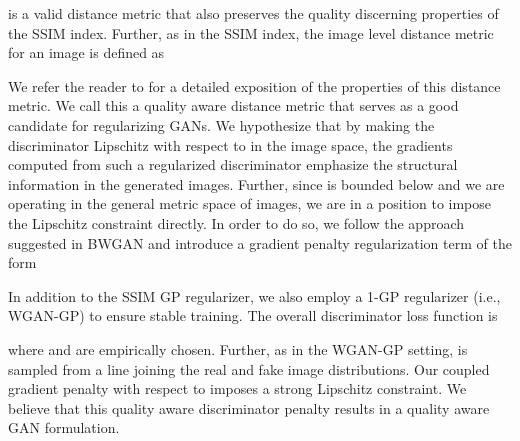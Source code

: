 \documentclass{article}
\begin{document}
is a valid distance metric that also preserves the quality discerning properties of the SSIM index. Further, as in the SSIM index, the image level distance metric for an  image is defined as

We refer the reader to \cite{brunet2011mathematical} for a detailed exposition of the properties of this distance metric. We call this a quality aware distance metric that serves as a good candidate for regularizing GANs.
We hypothesize that by making the discriminator Lipschitz with respect to  in the image space, the gradients computed from such a regularized discriminator emphasize the structural information in the generated images. Further, since  is bounded below and we are operating in the general metric space of images, we are in a position to impose the Lipschitz constraint directly. In order to do so, we follow the approach suggested in BWGAN \cite{adler2018banach} and introduce a gradient penalty regularization term of the form



In addition to the SSIM GP regularizer, we also employ a 1-GP regularizer (i.e., WGAN-GP) to ensure stable training.
The overall discriminator loss function is

where  and  are empirically chosen. Further, as in the WGAN-GP setting,  is sampled from a line joining the real and fake image distributions.
Our coupled gradient penalty with respect to  imposes a strong Lipschitz constraint. We believe that this quality aware discriminator penalty results in a quality aware GAN formulation.
\end{document}
